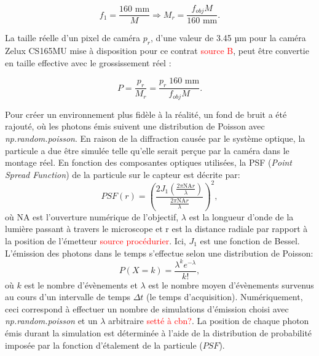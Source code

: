 \documentclass[conference]{IEEEtran}
\begin{document}
\begin{equation}
  f_{1}= \frac{160 \text{ mm} }{M} \Rightarrow M_{r} = \frac{f_{obj}M}{160 \text{ mm} }.
\end{equation}

La taille réelle d'un pixel de caméra $p_r$, d'une valeur de 3.45 µm pour la caméra Zelux CS165MU
mise à disposition pour ce contrat \textcolor{red}{source B}, peut être convertie en taille effective
avec le grossissement réel :

\begin{equation}\label{pixel}
  P = \frac{p_{r}}{M_{r}} = \frac{p_{r}\;160 \text{ mm}}{f_{obj}M}.
\end{equation}

Pour créer un environnement plus fidèle à la réalité, un fond de bruit
a été rajouté, où les photons émis suivent une distribution de Poisson avec \textit{np.random.poisson}. En raison de la diffraction 
causée par le système optique, la particule a due être simulée
telle qu'elle serait perçue par la caméra dans le montage réel. En fonction des composantes optiques utilisées,
la PSF (\textit{Point Spread Function}) de la particule sur le capteur est décrite par:
\begin{equation}
  PSF(r)=\left(\frac{2J_1(\frac{2\pi \text{NA}r}{\lambda})}{\frac{2\pi \text{NA}r}{\lambda}}\right)^2,
\end{equation}
où NA est l'ouverture numérique de l'objectif, $\lambda$ est la longueur d'onde de la lumière passant à travers
le microscope et r est la distance radiale par rapport à la position de l'émetteur \textcolor{red}{source procédurier}. Ici, $J_1$
est une fonction de Bessel. L'émission des photons dans le temps s'effectue selon une distribution de Poisson:
\begin{equation}
  P(X=k)=\frac{\lambda^k e^{-\lambda}}{k!},
\end{equation}
où $k$ est le nombre d'évènements et $\lambda$ est le nombre moyen d'évènements
survenus au cours d'un intervalle de temps $\Delta t$ (le temps d'acquisition). Numériquement, ceci correspond à effectuer un nombre de simulations
d'émission choisi avec \textit{np.random.poisson} et un $\lambda$ arbitraire \textcolor{red}{setté à cbn?}. La position de chaque photon
émis durant la simulation est déterminée à l'aide de la distribution de probabilité imposée par la fonction d'étalement 
de la particule ($PSF$).
\end{document}
